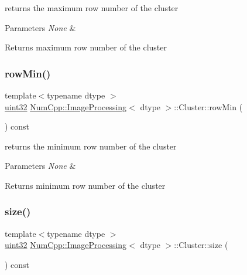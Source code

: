 returns the maximum row number of the cluster


\begin{DoxyParams}{Parameters}
{\em None} & \\
\hline
\end{DoxyParams}
\begin{DoxyReturn}{Returns}
maximum row number of the cluster 
\end{DoxyReturn}
\mbox{\label{class_num_cpp_1_1_image_processing_1_1_cluster_a2040e13a30db15f57b0158c2dbbe928c}} 
\subsubsection{\texorpdfstring{row\+Min()}{rowMin()}}
{\footnotesize\ttfamily template$<$typename dtype $>$ \\
\mbox{\hyperlink{namespace_num_cpp_a36f388e948380413c63011cab9b7fbd5}{uint32}} \mbox{\hyperlink{class_num_cpp_1_1_image_processing}{Num\+Cpp\+::\+Image\+Processing}}$<$ dtype $>$\+::Cluster\+::row\+Min (\begin{DoxyParamCaption}{ }\end{DoxyParamCaption}) const\hspace{0.3cm}{\ttfamily [inline]}}

returns the minimum row number of the cluster


\begin{DoxyParams}{Parameters}
{\em None} & \\
\hline
\end{DoxyParams}
\begin{DoxyReturn}{Returns}
minimum row number of the cluster 
\end{DoxyReturn}
\mbox{\label{class_num_cpp_1_1_image_processing_1_1_cluster_a2bc0bdc7e0badf9d7487850b3df24289}} 
\subsubsection{\texorpdfstring{size()}{size()}}
{\footnotesize\ttfamily template$<$typename dtype $>$ \\
\mbox{\hyperlink{namespace_num_cpp_a36f388e948380413c63011cab9b7fbd5}{uint32}} \mbox{\hyperlink{class_num_cpp_1_1_image_processing}{Num\+Cpp\+::\+Image\+Processing}}$<$ dtype $>$\+::Cluster\+::size (\begin{DoxyParamCaption}{ }\end{DoxyParamCaption}) const\hspace{0.3cm}{\ttfamily [inline]}}

